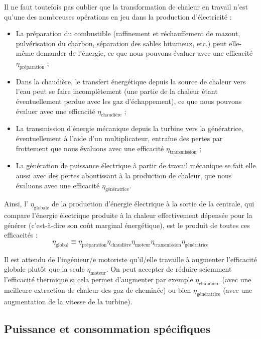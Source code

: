 		Il ne faut toutefois pas oublier que la transformation de chaleur en travail n’est qu’une des nombreuses opérations en jeu dans la production d’électricité :
		\begin{itemize}
			\item La préparation du combustible (raffinement et réchauffement de mazout, pulvérisation du charbon, séparation des sables bitumeux, etc.) peut elle-même demander de l’énergie, ce que nous pouvons évaluer avec une efficacité $\eta_\text{préparation}$ ;
			\item Dans la chaudière, le transfert énergétique depuis la source de chaleur vers l’eau peut se faire incomplètement (une partie de la chaleur étant éventuellement perdue avec les gaz d’échappement), ce que nous pouvons évaluer avec une efficacité $\eta_\text{chaudière}$ ;
			\item La transmission d’énergie mécanique depuis la turbine vers la génératrice, éventuellement à l’aide d’un multiplicateur, entraîne des pertes par frottement que nous évaluons avec une efficacité $\eta_\text{transmission}$ ;
			\item La génération de puissance électrique à partir de travail mécanique se fait elle aussi avec des pertes aboutissant à la production de chaleur, que nous évaluons avec une efficacité $\eta_\text{génératrice}$.
		\end{itemize}
		
		Ainsi, l’ $\eta_\text{globale}$ de la production d’énergie électrique à la sortie de la centrale, qui compare l’énergie électrique produite à la chaleur effectivement dépensée pour la générer (c’est-à-dire son coût marginal énergétique), est le produit de toutes ces efficacités :
		\begin{equation}
			\eta_\text{global} \equiv \eta_\text{préparation} \eta_\text{chaudière} \eta_\text{moteur} \eta_\text{transmission} \eta_\text{génératrice}
		\end{equation}
		
		Il est attendu de l’ingénieur/e motoriste qu’il/elle travaille à augmenter l’efficacité globale plutôt que la seule $\eta_\text{moteur}$. On peut accepter de réduire sciemment l’efficacité thermique si cela permet d’augmenter par exemple $\eta_\text{chaudière}$ (avec une meilleure extraction de chaleur des gaz de cheminée) ou bien $\eta_\text{génératrice}$ (avec une augmentation de la vitesse de la turbine).

	\subsection{Puissance et consommation spécifiques}
	\label{ch_SSC}
		
